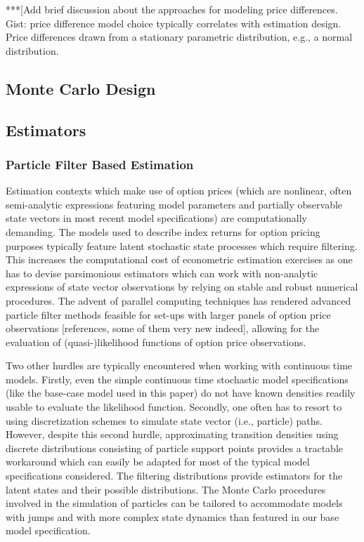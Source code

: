 \documentclass[11pt,a4paper,notitlepage]{article}
\numberwithin{equation}{section}
\begin{document}
***[Add brief discussion about the approaches for modeling price differences. Gist: price difference model choice typically correlates with estimation design. Price differences  drawn from a stationary parametric distribution, e.g., a normal distribution. 

\subsection{Monte Carlo Design}

\subsection{Estimators}

\subsubsection{Particle Filter Based Estimation}
Estimation contexts which make use of option prices (which are nonlinear, often semi-analytic expressions featuring model parameters and partially observable state vectors in most recent model specifications) are computationally demanding. The models used to describe index returns for option pricing purposes typically feature latent stochastic state processes which require filtering. This increases the computational cost of econometric estimation exercises as one has to devise parsimonious estimators which can work with non-analytic expressions of state vector observations by relying on stable and robust numerical procedures. The advent of parallel computing techniques has rendered advanced particle filter methods feasible for set-ups with larger panels of option price observations [references, some of them very new indeed], allowing for the evaluation of (quasi-)likelihood functions of option price observations.

Two other hurdles are typically encountered when working with continuous time models. Firstly, even the simple continuous time stochastic model specifications (like the base-case model used in this paper) do not have known densities readily usable to evaluate the likelihood function. Secondly, one often has to resort to using discretization schemes to simulate state vector (i.e., particle) paths. However, despite this second hurdle, approximating transition densities using discrete distributions consisting of particle support points provides a tractable workaround which can easily be adapted for most of the typical model specifications considered. The filtering distributions provide estimators for the latent states and their possible distributions. The Monte Carlo procedures involved in the simulation of particles can be tailored to accommodate models with jumps and with more complex state dynamics than featured in our base model specification. 
\end{document}

